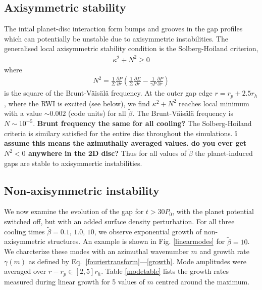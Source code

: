 \subsection{Axisymmetric stability}
The intial planet-disc interaction form bumps and grooves in the gap profiles
which can potentially be unstable due to axisymmetric instabilities. The
generalised local axisymmetric stability condition is the Solberg-Hoiland
criterion,  
\begin{align}
  \kappa^2+N^2 \geq 0 
\end{align}
where
\begin{align}
 N^2=\frac{1}{\Sigma} \frac{\partial P}{\partial r}
 \left(\frac{1}{\Sigma} \frac{\partial \Sigma}{\partial
     r}-\frac{1}{\gamma P} \frac{\partial P}{\partial r}  \right) 
\end{align}
is the square of the Brunt-V\"ais\"al\"a frequency. 
At the outer gap edge $r=r_p+2.5r_h$,  where the RWI is excited
(see below), we find $\kappa^2 + N^2$ reaches local minimum with a value
$\sim 0.002$ (code units) for all $\tilde\beta$. The
Brunt-V\"ais\"al\"a frequency is $N\sim 10^{-5}$. 
{\bf Brunt frequency the same for all cooling?}
The Solberg-Hoiland criteria is similary satisfied for the entire disc throughout the 
simulations. {\bf i assume this means the azimuthally averaged
  values. do you ever get $N^2<0$ anywhere in the 2D disc?}  
Thus for all values of $\tilde\beta$ the planet-induced gaps are
stable to axisymmertic instabilities. 

\subsection{Non-axisymmetric instability}\label{linear}
We now examine the evolution of the gap for $t>30P_0$, with the
planet potential switched off, but with an added surface density
perturbation. For all three cooling times $\tilde{\beta}=0.1,\, 1.0,\,
10$, we observe exponential growth of non-axisymmetric
structures.  
An example is shown in Fig. \ref{linearmodes} for 
$\tilde{\beta}=10$. We charcterize these
modes with an azimuthal wavenumber $m$ and growth rate $\gamma(m)$ as defined by
Eq.~\ref{fouriertransform}---\ref{growth}. Mode amplitudes were
averaged over $r-r_p\in[2,5]r_h$. Table \ref{modetable}
lists the growth rates measured during 
linear growth for 5 values of $m$ centred around the maximum. 

